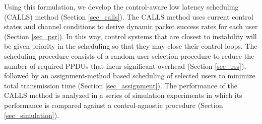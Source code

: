 Using this formulation, we develop the control-aware low latency scheduling (CALLS) method (Section \ref{sec_calls}). The CALLS method uses current control states and channel conditions to derive dynamic packet success rates for each user (Section \ref{sec_psr}). In this way, control systems that are closest to instability will be given priority in the scheduling so that they may close their control loops. The scheduling procedure consists of a random user selection procedure to reduce the number of required PPDUs that incur significant overhead  (Section \ref{sec_rss}), followed by an assignment-method based scheduling of selected users to minimize total transmission time (Section \ref{sec_assignment}). The performance of the CALLS method is analyzed in a series of simulation experiments in which its performance is compared against a control-agnostic procedure (Section \ref{sec_simulation}). 
